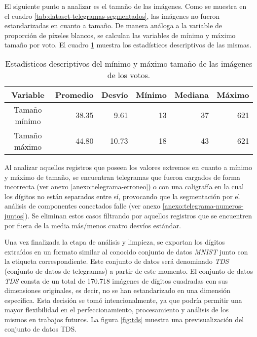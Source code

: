 El siguiente punto a analizar es el tamaño de las imágenes. Como se muestra en el cuadro
\ref{tab:dataset-telegramas-segmentados}, las imágenes no fueron estandarizadas en cuanto a tamaño. De manera análoga a
la variable de proporción de píxeles blancos, se calculan las variables de mínimo y máximo tamaño por voto. El cuadro
\ref{tab:describe-min-max-size} muestra los estadísticos descriptivos de las mismas.

\begin{table}[H]
    \centering
    \begin{tabular}{crrrrr}
        \toprule
        Variable      & Promedio & Desvío & Mínimo & Mediana & Máximo \\
        \midrule
        Tamaño mínimo & 38.35    & 9.61   & 13     & 37      & 621    \\
        Tamaño máximo & 44.80    & 10.73  & 18     & 43      & 621    \\
        \bottomrule
    \end{tabular}
    \caption[Estadísticos descriptivos de los dígitos]{Estadísticos descriptivos del mínimo y máximo tamaño de las imágenes de los votos.}
    \label{tab:describe-min-max-size}
\end{table}

Al analizar aquellos registros que poseen los valores extremos en cuanto a mínimo y máximo de tamaño, se encuentran
telegramas que fueron cargados de forma incorrecta (ver anexo \ref{anexo:telegrama-erroneo}) o con una caligrafía en la
cual los dígitos no están separados entre sí, provocando que la segmentación por el análisis de componentes conectados
falle (ver anexo \ref{anexo:telegrama-numeros-juntos}). Se eliminan estos casos filtrando por aquellos registros que se
encuentren por fuera de la media más/menos cuatro desvíos estándar.

Una vez finalizada la etapa de análisis y limpieza, se exportan los dígitos extraídos en un formato similar al conocido
conjunto de datos {\it MNIST} junto con la etiqueta correspondiente. Este conjunto de datos será denominado {\it TDS}
(conjunto de datos de telegramas) a partir de este momento. El conjunto de datos {\it TDS} consta de un total de
170.718 imágenes de dígitos cuadradas con sus dimensiones originales, es decir, no se han estandarizado en una
dimensión específica. Esta decisión se tomó intencionalmente, ya que podría permitir una mayor flexibilidad en el
perfeccionamiento, procesamiento y análisis de los mismos en trabajos futuros. La figura \ref{fig:tds} muestra una
previsualización del conjunto de datos TDS.

